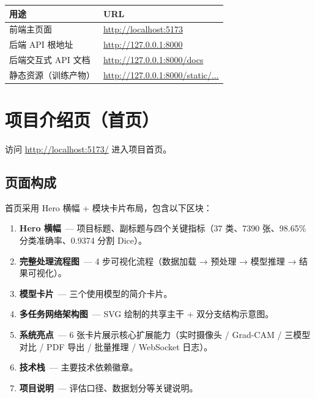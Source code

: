 \documentclass[12pt, a4paper, openany]{ctexbook}
\begin{document}
\begin{center}
\begin{tabular}{lL{8cm}}
  \toprule
  \textbf{用途} & \textbf{URL} \\
  \midrule
  前端主页面            & \url{http://localhost:5173}            \\
  后端 API 根地址       & \url{http://127.0.0.1:8000}            \\
  后端交互式 API 文档   & \url{http://127.0.0.1:8000/docs}       \\
  静态资源（训练产物）   & \url{http://127.0.0.1:8000/static/...} \\
  \bottomrule
\end{tabular}
\end{center}

\chapter{项目介绍页（首页）}

访问 \url{http://localhost:5173/} 进入项目首页。

\section{页面构成}

首页采用 Hero 横幅 + 模块卡片布局，包含以下区块：

\begin{enumerate}[leftmargin=*]
  \item \textbf{Hero 横幅}\ — 项目标题、副标题与四个关键指标（37 类、7390 张、98.65\% 分类准确率、0.9374 分割 Dice）。
  \item \textbf{完整处理流程图}\ — 4 步可视化流程（数据加载 → 预处理 → 模型推理 → 结果可视化）。
  \item \textbf{模型卡片}\ — 三个使用模型的简介卡片。
  \item \textbf{多任务网络架构图}\ — SVG 绘制的共享主干 + 双分支结构示意图。
  \item \textbf{系统亮点}\ — 6 张卡片展示核心扩展能力（实时摄像头 / Grad-CAM / 三模型对比 / PDF 导出 / 批量推理 / WebSocket 日志）。
  \item \textbf{技术栈}\ — 主要技术依赖徽章。
  \item \textbf{项目说明}\ — 评估口径、数据划分等关键说明。
\end{enumerate}
\end{document}
